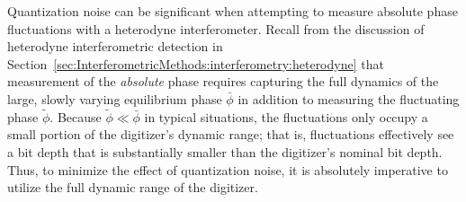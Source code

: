 Quantization noise can be significant
when attempting to measure absolute phase fluctuations
with a heterodyne interferometer.
Recall from the discussion of heterodyne interferometric detection in
Section~\ref{sec:InterferometricMethods:interferometry:heterodyne}
that measurement of the \emph{absolute} phase
requires capturing the full dynamics
of the large, slowly varying equilibrium phase $\bar{\phi}$
in addition to measuring the fluctuating phase $\tilde{\phi}$.
Because $\tilde{\phi} \ll \bar{\phi}$ in typical situations,
the fluctuations only occupy a small portion
of the digitizer's dynamic range; that is,
fluctuations effectively see a bit depth that
is substantially smaller than the digitizer's nominal bit depth.
Thus, to minimize the effect of quantization noise,
it is absolutely imperative
to utilize the full dynamic range of the digitizer.




